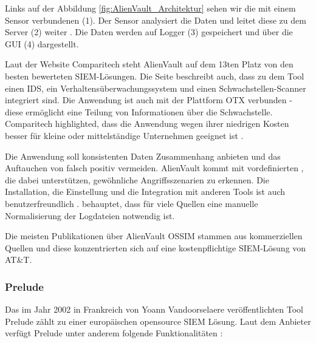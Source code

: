 
Links auf der Abbildung \ref{fig:AlienVault_Architektur} sehen wir die mit einem Sensor verbundenen  (1). Der Sensor analysiert die Daten und leitet diese zu dem Server (2) weiter \citep{AV_Sensor}. Die Daten werden auf Logger (3) gespeichert und über die \gls{GUI} (4) dargestellt.

Laut der Website Comparitech steht AlienVault auf dem 13ten Platz von den besten bewerteten \gls{SIEM}-Lösungen. Die Seite beschreibt auch, dass zu dem Tool einen \gls{IDS}, ein Verhaltensüberwachungssystem und einen Schwachstellen-Scanner integriert sind. Die Anwendung ist auch mit der Plattform \gls{OTX} verbunden - diese ermöglicht eine Teilung von Informationen über die Schwachstelle. Comparitech highlighted, dass die Anwendung wegen ihrer niedrigen Kosten besser für kleine oder mittelständige Unternehmen geeignet ist \citep{comparitech_SIEM}.

Die Anwendung soll konsistenten Daten Zusammenhang anbieten und das Auftauchen von \gls{falsch positiv} vermeiden. AlienVault kommt mit vordefinierten , die dabei unterstützen, gewöhnliche Angriffsszenarien zu erkennen. Die Installation, die Einstellung und die Integration mit anderen Tools ist auch benutzerfreundlich \citep{Gomes_AV}. \cite{Nabil_AV} behauptet, dass für viele Quellen eine manuelle Normalisierung der Logdateien notwendig ist.


Die meisten Publikationen über AlienVault OSSIM stammen aus kommerziellen Quellen und diese konzentrierten sich auf eine kostenpflichtige \gls{SIEM}-Lösung von AT\&T.

\subsubsection{Prelude}
Das im Jahr 2002 in Frankreich von Yoann Vandoorselaere veröffentlichten Tool Prelude zählt zu einer europäischen \gls{opensource} \gls{SIEM} Lösung. Laut dem Anbieter verfügt Prelude unter anderem folgende Funktionalitäten \citep{Prelude_SIEM}:

